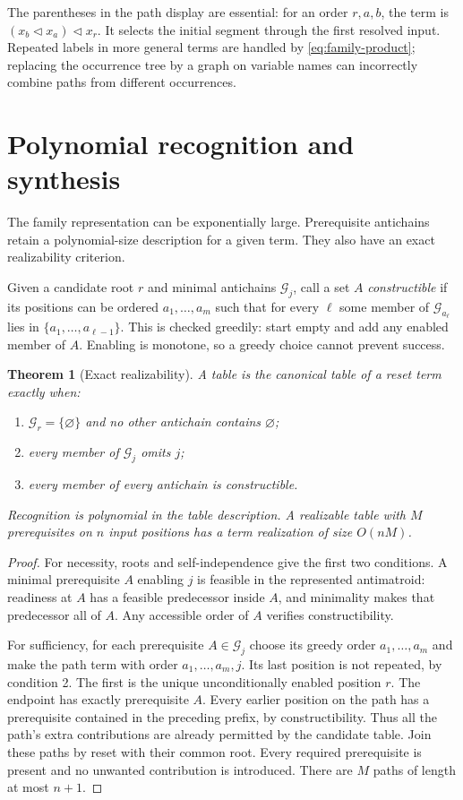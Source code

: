 \documentclass[11pt]{article}
\newtheorem{theorem}{Theorem}[section]
\newcommand{\del}{\mathbin{\triangleleft}}
\begin{document}
The parentheses in the path display are essential: for an order
$r,a,b$, the term is $(x_b\del x_a)\del x_r$. It selects the initial
segment through the first resolved input. Repeated labels in more
general terms are handled by \eqref{eq:family-product}; replacing the
occurrence tree by a graph on variable names can incorrectly combine
paths from different occurrences.

\section{Polynomial recognition and synthesis}

The family representation can be exponentially large. Prerequisite
antichains retain a polynomial-size description for a given term.
They also have an exact realizability criterion.

Given a candidate root $r$ and minimal antichains $\mathcal G_j$,
call a set $A$ \emph{constructible} if its positions can be ordered
$a_1,\ldots,a_m$ such that for every $\ell$ some member of
$\mathcal G_{a_\ell}$ lies in $\{a_1,\ldots,a_{\ell-1}\}$.
This is checked greedily: start empty and add any enabled member of
$A$. Enabling is monotone, so a greedy choice cannot prevent success.

\begin{theorem}[Exact realizability]\label{thm:synthesis}
A table is the canonical table of a reset term exactly when:
\begin{enumerate}
\item $\mathcal G_r=\{\varnothing\}$ and no other antichain contains
$\varnothing$;
\item every member of $\mathcal G_j$ omits $j$;
\item every member of every antichain is constructible.
\end{enumerate}
Recognition is polynomial in the table description. A realizable
table with $M$ prerequisites on $n$ input positions has a term
realization of size $O(nM)$.
\end{theorem}
\begin{proof}
For necessity, roots and self-independence give the first two
conditions. A minimal prerequisite $A$ enabling $j$ is feasible in the
represented antimatroid: readiness at $A$ has a feasible predecessor
inside $A$, and minimality makes that predecessor all of $A$.
Any accessible order of $A$ verifies constructibility.

For sufficiency, for each prerequisite $A\in\mathcal G_j$ choose its
greedy order $a_1,\ldots,a_m$ and make the path term with order
$a_1,\ldots,a_m,j$. Its last position is not repeated, by condition 2.
The first is the unique unconditionally enabled position $r$.
The endpoint has exactly prerequisite $A$. Every earlier position on
the path has a prerequisite contained in the preceding prefix, by
constructibility. Thus all the path's extra contributions are already
permitted by the candidate table. Join these paths by reset with their
common root. Every required prerequisite is present and no unwanted
contribution is introduced. There are $M$ paths of length at most
$n+1$.
\end{proof}
\end{document}
